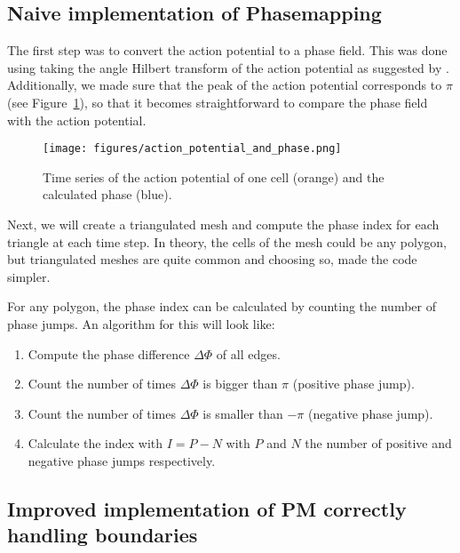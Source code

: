 \documentclass[twocolumn]{article}
\begin{document}
\subsection{Naive implementation of Phasemapping}

The first step was to convert the action potential to a phase field.
This was done using taking the angle Hilbert transform of the action
potential as suggested by \autocite{bray2002considerations}. Additionally,
we made sure that the peak of the action potential corresponds to
\(\pi\) (see Figure~\ref{fig:action_potential_and_phase}),
so that it becomes straightforward to compare the phase field with
the action potential.

\begin{figure}[ht]
  \begin{center}
    \texttt{[image: figures/action\_potential\_and\_phase.png]}
  \end{center}
  \caption{
    Time series of the action potential of one cell (orange)
    and the calculated phase (blue).
  }\label{fig:action_potential_and_phase}
\end{figure}

Next, we will create a triangulated mesh and compute the phase index for
each triangle at each time step. In theory, the cells of the mesh could
be any polygon, but triangulated meshes are quite common and choosing
so, made the code simpler.

For any polygon, the phase index can be calculated by counting the
number of phase jumps. An algorithm for this will look like:

\begin{enumerate}
    \def\labelenumi{\arabic{enumi}.}
    \tightlist
  \item
    Compute the phase difference \(\Delta\Phi\) of all edges.
  \item
    Count the number of times \(\Delta\Phi\) is bigger than \(\pi\)
    (positive phase jump).
  \item
    Count the number of times \(\Delta\Phi\) is smaller than \(-\pi\)
    (negative phase jump).
  \item
    Calculate the index with \(I = P - N\) with \(P\) and \(N\) the number
    of positive and negative phase jumps respectively.
\end{enumerate}

\subsection{Improved implementation of PM correctly handling boundaries}
\end{document}
